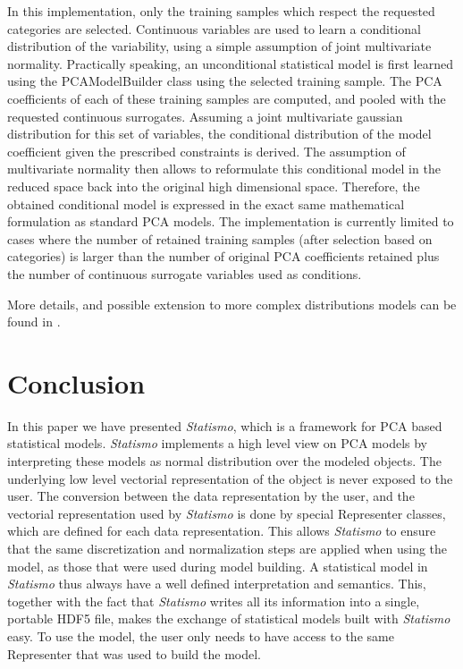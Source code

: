 \documentclass{InsightArticle}
\newcommand{\Statismo}{\emph{Statismo}\xspace}
\begin{document}
In this implementation, only the training samples which respect the
requested categories are selected.  Continuous variables are used to
learn a conditional distribution of the variability, using a simple
assumption of joint multivariate normality. Practically speaking, an
unconditional statistical model is first learned using the
PCAModelBuilder class using the selected training sample. The PCA
coefficients of each of these training samples are computed, and
pooled with the requested continuous surrogates. Assuming a joint
multivariate gaussian distribution for this set of variables, the
conditional distribution of the model coefficient given the prescribed
constraints is derived. The assumption of multivariate normality then
allows to reformulate this conditional model in the reduced space back
into the original high dimensional space. Therefore, the obtained
conditional model is expressed in the exact same mathematical
formulation as standard PCA models.  The implementation is currently
limited to cases where the number of retained training samples (after
selection based on categories) is larger than the number of original
PCA coefficients retained plus the number of continuous surrogate
variables used as conditions.

More details, and possible extension to more complex distributions
models can be found in \cite{blanc_conditional_2009}.

\section{Conclusion}
In this paper we have presented \Statismo, which is a framework for
PCA based statistical models.  \Statismo implements a high level view
on PCA models by interpreting these models as normal distribution over
the modeled objects. The underlying low level vectorial representation
of the object is never exposed to the user.  The conversion between
the data representation by the user, and the vectorial representation
used by \Statismo is done by special Representer classes, which are
defined for each data representation. This allows \Statismo to ensure
that the same discretization and normalization steps are applied when
using the model, as those that were used during model building.  A
statistical model in \Statismo thus always have a well defined
interpretation and semantics.  This, together with the fact that
\Statismo writes all its information into a single, portable HDF5
file, makes the exchange of statistical models built with \Statismo
easy. To use the model, the user only needs to have access to the same Representer that was used to build the model. 
\end{document}
